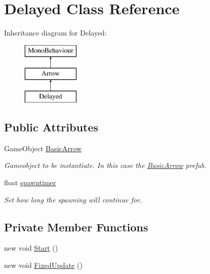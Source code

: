 \hypertarget{class_delayed}{}\section{Delayed Class Reference}
\label{class_delayed}
Inheritance diagram for Delayed\+:\begin{figure}[H]
\begin{center}
\leavevmode
\includegraphics[height=3.000000cm]{class_delayed}
\end{center}
\end{figure}
\subsection*{Public Attributes}
\begin{DoxyCompactItemize}
\item 
\mbox{\label{class_delayed_ace12fa36fce732dcb6302d3fc5a43a12}} 
Game\+Object \hyperlink{class_delayed_ace12fa36fce732dcb6302d3fc5a43a12}{Basic\+Arrow}
\begin{DoxyCompactList}\small\item\em Gameobject to be instantiate. In this case the \hyperlink{class_basic_arrow}{Basic\+Arrow} prefab. \end{DoxyCompactList}\item 
\mbox{\label{class_delayed_a2d248a33685341b8645c8060c6e291bd}} 
float \hyperlink{class_delayed_a2d248a33685341b8645c8060c6e291bd}{spawntimer}
\begin{DoxyCompactList}\small\item\em Set how long the spawning will continue for. \end{DoxyCompactList}\end{DoxyCompactItemize}
\subsection*{Private Member Functions}
\begin{DoxyCompactItemize}
\item 
new void \hyperlink{class_delayed_a680d8010c92af858e6d0ee4fe4711961}{Start} ()
\item 
new void \hyperlink{class_delayed_a2c17802ed1b249f91240a20a07ef1019}{Fixed\+Update} ()
\end{DoxyCompactItemize}
